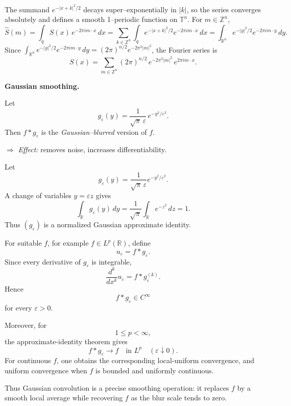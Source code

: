 \begin{solution}
The summand $e^{-|x+k|^2/2}$ decays super--exponentially in $|k|$, so the series converges absolutely and defines
a smooth 1--periodic function on $\mathbb T^n$.
For $m\in\mathbb Z^n$,
\[
\widehat S(m)=\int_{q} S(x)\,e^{-2\pi i m\cdot x}\,dx
=\sum_{k\in\mathbb Z^n}\int_{q} e^{-|x+k|^2/2}e^{-2\pi i m\cdot x}\,dx
=\int_{\mathbb R^n} e^{-|y|^2/2}e^{-2\pi i m\cdot y}\,dy.
\]
Since $\int_{\mathbb R^n} e^{-|y|^2/2}e^{-2\pi i m\cdot y}\,dy=(2\pi)^{n/2}e^{-2\pi^2|m|^2}$,
the Fourier series is
\[
S(x)=\sum_{m\in\mathbb Z^n} (2\pi)^{n/2}\,e^{-2\pi^2|m|^2}\,e^{2\pi i m\cdot x}.
\]

\clearpage
\bigskip
\end{solution}

\begin{problem}[CP-II-0161]
\label{prob:cp-ii-0161}
\textbf{Gaussian smoothing.}

\hspace*{1.5em}Let
\[
g_\varepsilon(y)
= \frac{1}{\sqrt{\pi}\,\varepsilon}\,e^{-y^2/\varepsilon^2}.
\]
Then $f*g_\varepsilon$ is the \emph{Gaussian--blurred} version of $f$.

\medskip
\noindent$\Rightarrow$ \emph{Effect:} removes noise, increases
differentiability.

\bigskip
\bigskip
\end{problem}

\begin{solution}
Let
\[
g_\varepsilon(y)
=
\frac1{\sqrt\pi\,\varepsilon}
e^{-y^2/\varepsilon^2}.
\]
A change of variables \(y=\varepsilon z\) gives
\[
\int_{\mathbb R}g_\varepsilon(y)\,dy
=
\frac1{\sqrt\pi}
\int_{\mathbb R}e^{-z^2}\,dz
=
1.
\]
Thus \((g_\varepsilon)\) is a normalized Gaussian approximate identity.

For suitable \(f\), for example \(f\in L^p(\mathbb R)\), define
\[
u_\varepsilon=f*g_\varepsilon.
\]
Since every derivative of \(g_\varepsilon\) is integrable,
\[
\frac{d^k}{dx^k}u_\varepsilon
=
f*g_\varepsilon^{(k)}.
\]
Hence
\[
\boxed{f*g_\varepsilon\in C^\infty}
\]
for every \(\varepsilon>0\).

Moreover, for
\[
1\le p<\infty,
\]
the approximate-identity theorem gives
\[
\boxed{
f*g_\varepsilon\to f
\quad\text{in }L^p
\quad(\varepsilon\downarrow0).
}
\]
For continuous \(f\), one obtains the corresponding local-uniform convergence, and uniform
convergence when \(f\) is bounded and uniformly continuous.

Thus Gaussian convolution is a precise smoothing operation: it replaces \(f\) by a smooth
local average while recovering \(f\) as the blur scale tends to zero.
\end{solution}


